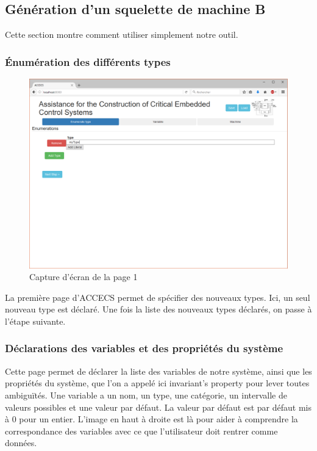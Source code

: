 \documentclass[a4paper]{article}
\begin{document}
\subsection{Génération d'un squelette de machine B}
    Cette section montre comment utiliser simplement notre outil.
    
\subsubsection{Énumération des différents types}
    
    \begin{figure}[ht]
        \centering
        \includegraphics[width=\textwidth]{screen1.png}
        \caption{Capture d'écran de la page 1}
        \label{fig:screen1}
    \end{figure}
    
    La première page d'ACCECS permet de spécifier des nouveaux types. Ici, un seul nouveau type est déclaré. Une fois la liste des nouveaux types déclarés, on passe à l'étape suivante.
    
\subsubsection{Déclarations des variables et des propriétés du système}
    Cette page permet de déclarer la liste des variables de notre système, ainsi que les propriétés du système, que l'on a appelé ici invariant's property pour lever toutes ambiguïtés. Une variable a un nom, un type, une catégorie, un intervalle de valeurs possibles et une valeur par défaut. La valeur par défaut est par défaut mis à 0 pour un entier. L'image en haut à droite est là pour aider à comprendre la correspondance des variables avec ce que l'utilisateur doit rentrer comme données.
    
\end{document}
